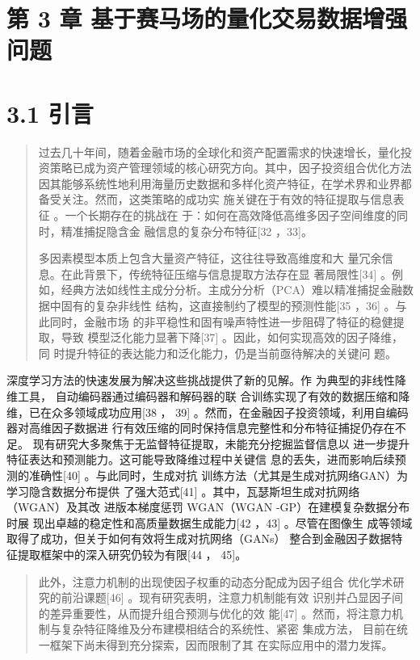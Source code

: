


\section{第 3 章
基于赛马场的量化交易数据增强问题}

\section{3.1 引言}

\begin{quote}
过去几十年间，随着金融市场的全球化和资产配置需求的快速增长，量化投资策略已成为资产管理领域的核心研究方向。其中，因子投资组合优化方法因其能够系统性地利用海量历史数据和多样化资产特征，在学术界和业界都备受关注。然而，这类策略的成功实
施关键在于有效的特征提取与信息表征 。一个长期存在的挑战在
于：如何在高效降低高维多因子空间维度的同时，精准捕捉隐含金
融信息的复杂分布特征{[}32 ，33{]}。

多因素模型本质上包含大量资产特征，这往往导致高维度和大
量冗余信息。在此背景下，传统特征压缩与信息提取方法存在显
著局限性{[}34{]}
。例如，经典方法如线性主成分分析。主成分分析（PCA）难以精准捕捉金融数据中固有的复杂非线性
结构，这直接制约了模型的预测性能{[}35 ，36{]} 。与此同时，金融市场
的非平稳性和固有噪声特性进一步阻碍了特征的稳健提取，导致
模型泛化能力显著下降{[}37{]} 。因此，如何实现高效的因子降维， 同
时提升特征的表达能力和泛化能力，仍是当前亟待解决的关键问 题。
\end{quote}

深度学习方法的快速发展为解决这些挑战提供了新的见解。作
为典型的非线性降维工具， 自动编码器通过编码器和解码器的联
合训练实现了有效的数据压缩和降维，已在众多领域成功应用{[}38 ， 39{]}
。然而，在金融因子投资领域，利用自编码器对高维因子数据进
行有效压缩的同时保持信息完整性和分布特征捕捉仍存在不足。
现有研究大多聚焦于无监督特征提取，未能充分挖掘监督信息以
进一步提升特征表达和预测能力。这可能导致降维过程中关键信
息的丢失，进而影响后续预测的准确性{[}40{]} 。与此同时，生成对抗
训练方法（尤其是生成对抗网络GAN）为学习隐含数据分布提供
了强大范式{[}41{]} 。其中，瓦瑟斯坦生成对抗网络（WGAN）及其改
进版本梯度惩罚 WGAN（WGAN -GP）在建模复杂数据分布时展
现出卓越的稳定性和高质量数据生成能力{[}42 ，43{]} 。尽管在图像生
成等领域取得了成功，但关于如何有效将生成对抗网络（GANs）
整合到金融因子数据特征提取框架中的深入研究仍较为有限{[}44 ， 45{]}。

\begin{quote}
此外，注意力机制的出现使因子权重的动态分配成为因子组合
优化学术研究的前沿课题{[}46{]} 。现有研究表明，注意力机制能有效
识别并凸显因子间的差异重要性，从而提升组合预测与优化的效 能{[}47{]}
。然而，将注意力机制与复杂特征降维及分布建模相结合的系统性、紧密
集成方法， 目前在统一框架下尚未得到充分探索，因而限制了其
在实际应用中的潜力发挥。
\end{quote}

